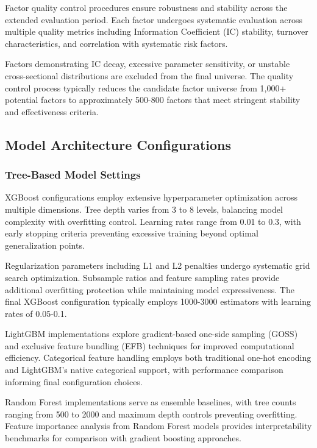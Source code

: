 \documentclass[conference]{IEEEtran}
\begin{document}
Factor quality control procedures ensure robustness and stability across the extended evaluation period. Each factor undergoes systematic evaluation across multiple quality metrics including Information Coefficient (IC) stability, turnover characteristics, and correlation with systematic risk factors.

Factors demonstrating IC decay, excessive parameter sensitivity, or unstable cross-sectional distributions are excluded from the final universe. The quality control process typically reduces the candidate factor universe from 1,000+ potential factors to approximately 500-800 factors that meet stringent stability and effectiveness criteria.

\subsection{Model Architecture Configurations}

\subsubsection{Tree-Based Model Settings}

XGBoost configurations employ extensive hyperparameter optimization across multiple dimensions. Tree depth varies from 3 to 8 levels, balancing model complexity with overfitting control. Learning rates range from 0.01 to 0.3, with early stopping criteria preventing excessive training beyond optimal generalization points.

Regularization parameters including L1 and L2 penalties undergo systematic grid search optimization. Subsample ratios and feature sampling rates provide additional overfitting protection while maintaining model expressiveness. The final XGBoost configuration typically employs 1000-3000 estimators with learning rates of 0.05-0.1.

LightGBM implementations explore gradient-based one-side sampling (GOSS) and exclusive feature bundling (EFB) techniques for improved computational efficiency. Categorical feature handling employs both traditional one-hot encoding and LightGBM's native categorical support, with performance comparison informing final configuration choices.

Random Forest implementations serve as ensemble baselines, with tree counts ranging from 500 to 2000 and maximum depth controls preventing overfitting. Feature importance analysis from Random Forest models provides interpretability benchmarks for comparison with gradient boosting approaches.
\end{document}
